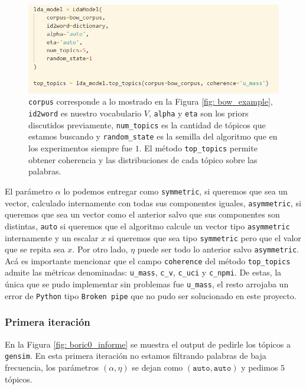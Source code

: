 \documentclass{article}
\begin{document}
	\begin{figure}[H]
		\centering
		\includegraphics[scale=.4]{../imgs/gensim_code_informe.png}
		\caption{\texttt{corpus} corresponde a lo mostrado en la Figura \ref{fig: bow_example}, \texttt{id2word} es nuestro vocabulario $V$, \texttt{alpha} y \texttt{eta} son los priors discutidos previamente, \texttt{num\_topics} es la cantidad de tópicos que estamos buscando y \texttt{random\_state} es la semilla del algoritmo que en los experimentos siempre fue $1$. El método \texttt{top\_topics} permite obtener coherencia y las distribuciones de cada tópico sobre las palabras.}
		\label{fig: gensim_code_informe}
	\end{figure}
	El parámetro $\alpha$ lo podemos entregar como \texttt{symmetric}, si queremos que sea un vector, calculado internamente con todas sus componentes iguales, \texttt{asymmetric}, si queremos que sea un vector como el anterior salvo que sus componentes son distintas, \texttt{auto} si queremos que el algoritmo calcule un vector tipo \texttt{asymmetric} internamente y un escalar $x$ si queremos que sea tipo \texttt{symmetric} pero que el valor que se repita sea $x$. Por otro lado, $\eta$ puede ser todo lo anterior salvo \texttt{asymmetric}. Acá es importante mencionar que el campo \texttt{coherence} del método \texttt{top\_topics} admite las métricas denominadas: \texttt{u\_mass}, \texttt{c\_v}, \texttt{c\_uci} y \texttt{c\_npmi}. De estas, la única que se pudo implementar sin problemas fue \texttt{u\_mass}, el resto arrojaba un error de \texttt{Python} tipo \texttt{Broken pipe} que no pudo ser solucionado en este proyecto.
	
\subsubsection{Primera iteración}
	 En la Figura \ref{fig: boric0_informe} se muestra el output de pedirle los tópicos a \texttt{gensim}. En esta primera iteración no estamos filtrando palabras de baja frecuencia, los parámetros $(\alpha, \eta)$ se dejan como $(\texttt{auto}, \texttt{auto})$ y pedimos $5$ tópicos. 
	
\end{document}
